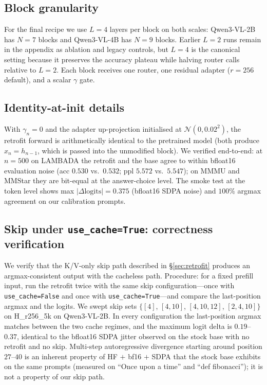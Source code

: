 \documentclass{article}
\begin{document}
\subsection{Block granularity}
\label{app:block_granularity}
For the final recipe we use $L{=}4$ layers per block on both scales: Qwen3-VL-2B has $N{=}7$ blocks and Qwen3-VL-4B has $N{=}9$ blocks. Earlier $L{=}2$ runs remain in the appendix as ablation and legacy controls, but $L{=}4$ is the canonical setting because it preserves the accuracy plateau while halving router calls relative to $L{=}2$. Each block receives one router, one residual adapter ($r{=}256$ default), and a scalar $\gamma$ gate.

\subsection{Identity-at-init details}
\label{app:identity}
With $\gamma_n{=}0$ and the adapter up-projection initialised at $\mathcal{N}(0, 0.02^2)$, the retrofit forward is arithmetically identical to the pretrained model (both produce $x_n = h_{n-1}$, which is passed into the unmodified block). We verified end-to-end: at $n{=}500$ on LAMBADA the retrofit and the base agree to within bfloat16 evaluation noise (acc $0.530$ vs.\ $0.532$; ppl $5.572$ vs.\ $5.547$); on MMMU and MMStar they are bit-equal at the answer-choice level. The smoke test at the token level shows max $|\Delta\text{logits}| = 0.375$ (bfloat16 SDPA noise) and $100\%$ argmax agreement on our calibration prompts.

\subsection{\texorpdfstring{Skip under \texttt{use\_cache=True}: correctness verification}{Skip under use cache: correctness verification}}
\label{app:kv_equiv}
We verify that the K/V-only skip path described in \S\ref{sec:retrofit} produces an argmax-consistent output with the cacheless path. Procedure: for a fixed prefill input, run the retrofit twice with the same skip configuration---once with \texttt{use\_cache=False} and once with \texttt{use\_cache=True}---and compare the last-position argmax and the logits. We swept skip sets $\{[4]$, $[4,10]$, $[4,10,12]$, $[2,4,10]\}$ on H\_r256\_5k on Qwen3-VL-2B. In every configuration the last-position argmax matches between the two cache regimes, and the maximum logit delta is $0.19$--$0.37$, identical to the bfloat16 SDPA jitter observed on the stock base with no retrofit and no skip. Multi-step autoregressive divergence starting around position $27$--$40$ is an inherent property of HF $+$ bf16 $+$ SDPA that the stock base exhibits on the same prompts (measured on ``Once upon a time'' and ``def fibonacci''); it is not a property of our skip path.
\end{document}
